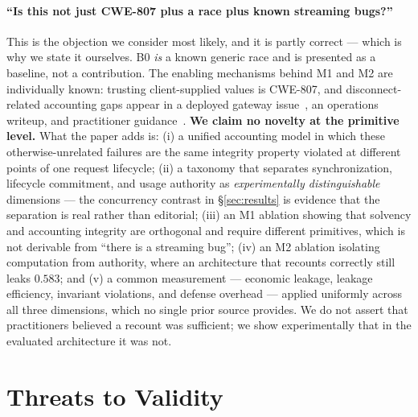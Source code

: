 \documentclass[11pt]{article}
\begin{document}
\paragraph{``Is this not just CWE-807 plus a race plus known streaming bugs?''}
This is the objection we consider most likely, and it is partly correct --- which is why
we state it ourselves. B0 \emph{is} a known generic race and is presented as a baseline,
not a contribution. The enabling mechanisms behind M1 and M2 are individually known:
trusting client-supplied values is CWE-807, and disconnect-related accounting gaps appear
in a deployed gateway issue~\cite{newapi5235}, an operations writeup, and practitioner
guidance~\cite{practice}. \textbf{We claim no novelty at the primitive level.} What the
paper adds is: (i) a unified accounting model in which these otherwise-unrelated failures
are the same integrity property violated at different points of one request lifecycle;
(ii) a taxonomy that separates synchronization, lifecycle commitment, and usage authority
as \emph{experimentally distinguishable} dimensions --- the concurrency contrast in
\S\ref{sec:results} is evidence that the separation is real rather than editorial;
(iii) an M1 ablation showing that solvency and accounting integrity are orthogonal and
require different primitives, which is not derivable from ``there is a streaming bug'';
(iv) an M2 ablation isolating computation from authority, where an architecture that
recounts correctly still leaks $0.583$; and (v) a common measurement --- economic leakage,
leakage efficiency, invariant violations, and defense overhead --- applied
uniformly across all three dimensions, which no single prior source provides. We do not
assert that practitioners believed a recount was sufficient; we show experimentally that
in the evaluated architecture it was not.

\section{Threats to Validity}
\label{sec:limits}
\end{document}
